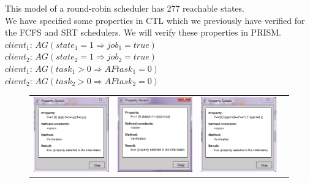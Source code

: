 \documentclass[12pt]{report}
\begin{document}
This model of a round-robin scheduler has 277 reachable states.\\
We have specified some properties in CTL which we previously have verified for the FCFS and SRT schedulers. We will verify these properties in PRISM.\\
$client_1$: $AG (state_1 = 1 \Rightarrow job_1 = true)$\\
$client_2$: $AG (state_2 = 1 \Rightarrow job_2 = true)$\\
$client_1$: $AG(task_1>0 \Rightarrow AF task_1 = 0)$ \\
$client_2$: $AG(task_2>0 \Rightarrow AF task_2 = 0)$ \\
\begin{figure}[H]
			\centering
			\begin{tabular}{ l c c r }
				\includegraphics[scale=0.5]{../GFX/A1-1d-client1.png}
				& \includegraphics[scale=0.5]{../GFX/A1-1d-client2.png}
				& \includegraphics[scale=0.5]{../GFX/A2-1RR.png}

\end{tabular}
\end{figure}
\end{document}
